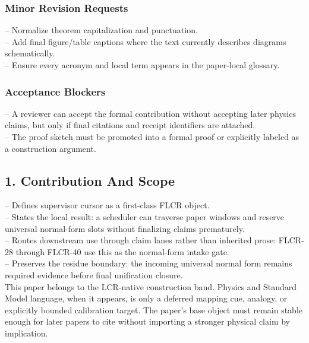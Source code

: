 \documentclass[11pt]{article}
\begin{document}
\subsubsection*{Minor Revision Requests}

\noindent{}-- Normalize theorem capitalization and punctuation.\\
\noindent{}-- Add final figure/table captions where the text currently describes diagrams schematically.\\
\noindent{}-- Ensure every acronym and local term appears in the paper-local glossary.\\

\subsubsection*{Acceptance Blockers}

\noindent{}-- A reviewer can accept the formal contribution without accepting later physics claims, but only if final citations and receipt identifiers are attached.\\
\noindent{}-- The proof sketch must be promoted into a formal proof or explicitly labeled as a construction argument.\\


\subsection*{1. Contribution And Scope}

\noindent{}-- Defines supervisor cursor as a first-class FLCR object.\\
\noindent{}-- States the local result: a scheduler can traverse paper windows and reserve universal normal-form slots without finalizing claims prematurely.\\
\noindent{}-- Routes downstream use through claim lanes rather than inherited prose: FLCR-28 through FLCR-40 use this as the normal-form intake gate.\\
\noindent{}-- Preserves the residue boundary: the incoming universal normal form remains required evidence before final unification closure.\\

This paper belongs to the LCR-native construction band. Physics and Standard Model language, when it appears, is only a deferred mapping cue, analogy, or explicitly bounded calibration target. The paper's base object must remain stable enough for later papers to cite without importing a stronger physical claim by implication.
\end{document}
